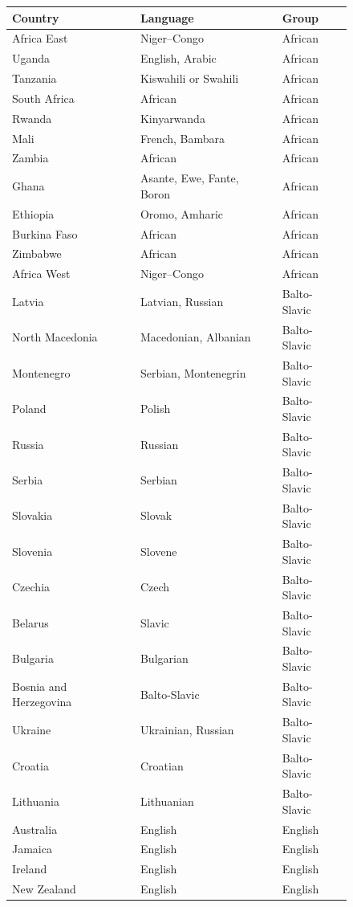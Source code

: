 \documentclass[a4paper,10pt]{article}
\begin{document}
\begin{figure}
\begin{longtable}[]{@{}lll@{}}
\toprule
Country & Language & Group \\
\midrule
\endhead
Africa East & Niger--Congo & African \\
Uganda & English, Arabic & African \\
Tanzania & Kiswahili or Swahili & African \\
South Africa & African & African \\
Rwanda & Kinyarwanda & African \\
Mali & French, Bambara & African \\
Zambia & African & African \\
Ghana & Asante, Ewe, Fante, Boron & African \\
Ethiopia & Oromo, Amharic & African \\
Burkina Faso & African & African \\
Zimbabwe & African & African \\
Africa West & Niger--Congo & African \\
Latvia & Latvian, Russian & Balto-Slavic \\
North Macedonia & Macedonian, Albanian & Balto-Slavic \\
Montenegro & Serbian, Montenegrin & Balto-Slavic \\
Poland & Polish & Balto-Slavic \\
Russia & Russian & Balto-Slavic \\
Serbia & Serbian & Balto-Slavic \\
Slovakia & Slovak & Balto-Slavic \\
Slovenia & Slovene & Balto-Slavic \\
Czechia & Czech & Balto-Slavic \\
Belarus & Slavic & Balto-Slavic \\
Bulgaria & Bulgarian & Balto-Slavic \\
Bosnia and Herzegovina & Balto-Slavic & Balto-Slavic \\
Ukraine & Ukrainian, Russian & Balto-Slavic \\
Croatia & Croatian & Balto-Slavic \\
Lithuania & Lithuanian & Balto-Slavic \\
Australia & English & English \\
Jamaica & English & English \\
Ireland & English & English \\
New Zealand & English & English \\

\end{longtable}
\end{figure}
\end{document}
